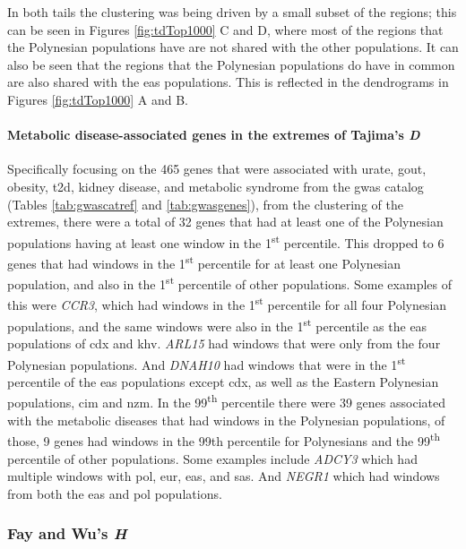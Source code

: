 \documentclass[]{report}
\let\oldparagraph\paragraph
\renewcommand{\paragraph}[1]{\oldparagraph{#1}\mbox{}}
\begin{document}
In both tails the clustering was being driven by a small subset of the
regions; this can be seen in Figures \ref{fig:tdTop1000} C and D, where
most of the regions that the Polynesian populations have are not shared
with the other populations. It can also be seen that the regions that
the Polynesian populations do have in common are also shared with the
\gls{eas} populations. This is reflected in the dendrograms in Figures
\ref{fig:tdTop1000} A and B.

\paragraph{\texorpdfstring{Metabolic disease-associated genes in the
extremes of Tajima's
\emph{D}}{Metabolic disease-associated genes in the extremes of Tajima's D}}\label{metabolic-disease-associated-genes-in-the-extremes-of-tajimas-d}

Specifically focusing on the 465 genes that were associated with urate,
gout, obesity, \gls{t2d}, kidney disease, and metabolic syndrome from
the \gls{gwas} catalog (Tables \ref{tab:gwascatref} and
\ref{tab:gwasgenes}), from the clustering of the extremes, there were a
total of 32 genes that had at least one of the Polynesian populations
having at least one window in the 1\textsuperscript{st} percentile. This
dropped to 6 genes that had windows in the 1\textsuperscript{st}
percentile for at least one Polynesian population, and also in the
1\textsuperscript{st} percentile of other populations. Some examples of
this were \emph{CCR3}, which had windows in the 1\textsuperscript{st}
percentile for all four Polynesian populations, and the same windows
were also in the 1\textsuperscript{st} percentile as the \gls{eas}
populations of \gls{cdx} and \gls{khv}. \emph{ARL15} had windows that
were only from the four Polynesian populations. And \emph{DNAH10} had
windows that were in the 1\textsuperscript{st} percentile of the
\gls{eas} populations except \gls{cdx}, as well as the Eastern
Polynesian populations, \gls{cim} and \gls{nzm}. In the
99\textsuperscript{th} percentile there were 39 genes associated with
the metabolic diseases that had windows in the Polynesian populations,
of those, 9 genes had windows in the 99th percentile for Polynesians and
the 99\textsuperscript{th} percentile of other populations. Some
examples include \emph{ADCY3} which had multiple windows with \gls{pol},
\gls{eur}, \gls{eas}, and \gls{sas}. And \emph{NEGR1} which had windows
from both the \gls{eas} and \gls{pol} populations.

\subsubsection{\texorpdfstring{Fay and Wu's
\emph{H}}{Fay and Wu's H}}\label{fay-and-wus-h-1}
\end{document}
